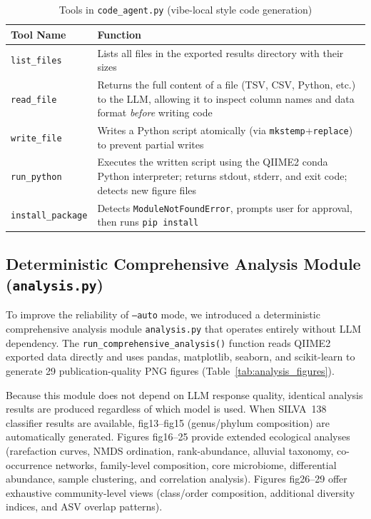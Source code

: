 \documentclass[12pt, a4paper]{article}
\begin{document}
\begin{table}[h]
  \centering
  \caption{Tools in \texttt{code\_agent.py} (vibe-local style code generation)}
  \label{tab:tools_code}
  \begin{tabular}{lp{8cm}}
    \toprule
    \textbf{Tool Name} & \textbf{Function} \\
    \midrule
    \texttt{list\_files} &
      Lists all files in the exported results directory with their sizes \\
    \texttt{read\_file} &
      Returns the full content of a file (TSV, CSV, Python, etc.) to the LLM,
      allowing it to inspect column names and data format \emph{before} writing code \\
    \texttt{write\_file} &
      Writes a Python script atomically (via \texttt{mkstemp}+\texttt{replace})
      to prevent partial writes \\
    \texttt{run\_python} &
      Executes the written script using the QIIME2 conda Python interpreter;
      returns stdout, stderr, and exit code; detects new figure files \\
    \texttt{install\_package} &
      Detects \texttt{ModuleNotFoundError}, prompts user for approval,
      then runs \texttt{pip install} \\
    \bottomrule
  \end{tabular}
\end{table}

\subsection{Deterministic Comprehensive Analysis Module (\texttt{analysis.py})}

To improve the reliability of \texttt{--auto} mode, we introduced a
deterministic comprehensive analysis module \texttt{analysis.py} that
operates entirely without LLM dependency.
The \texttt{run\_comprehensive\_analysis()} function reads QIIME2 exported
data directly and uses pandas, matplotlib, seaborn, and scikit-learn to
generate 29 publication-quality PNG figures (Table~\ref{tab:analysis_figures}).

Because this module does not depend on LLM response quality,
identical analysis results are produced regardless of which model is used.
When SILVA~138 classifier results are available, fig13--fig15
(genus/phylum composition) are automatically generated.
Figures fig16--25 provide extended ecological analyses (rarefaction curves,
NMDS ordination, rank-abundance, alluvial taxonomy, co-occurrence networks,
family-level composition, core microbiome, differential abundance,
sample clustering, and correlation analysis).
Figures fig26--29 offer exhaustive community-level views (class/order composition,
additional diversity indices, and ASV overlap patterns).
\end{document}
